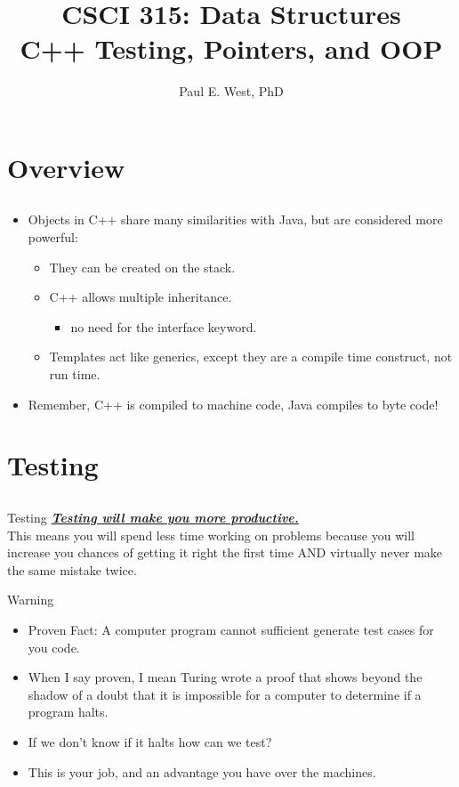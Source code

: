 \documentclass{beamer}
\title{CSCI 315: Data Structures \\ C++ Testing, Pointers, and OOP}
\author{Paul E. West, PhD}
\institute{
  Department of Computer Science\\
  Charleston Southern University
}
\begin{document}
\begin{frame}
  \titlepage
\end{frame}

\section{Overview}
\subsection{}

\begin{frame}{}
\begin{itemize}
\item Objects in C++ share many similarities with Java, but are considered more powerful:
\begin{itemize}
\item They can be created on the stack.
\item C++ allows multiple inheritance.
\begin{itemize}
\item no need for the interface keyword.
\end{itemize}
\item Templates act like generics, except they are a compile time construct, not run time.
\end{itemize}
\item Remember, C++ is compiled to machine code, Java compiles to byte code!
\end{itemize}
\end{frame}

\section{Testing}
\subsection{}

\begin{frame}{Testing}
\underline{\textbf{\textit{Testing will make you more productive.}}} \\
This means you will spend less time working on problems because you will increase you chances of getting it right the first time AND virtually never make the same mistake twice.
\end{frame}

\begin{frame}{Warning}
\begin{itemize}
\item Proven Fact: A computer program cannot sufficient generate test cases for you code.
\item When I say proven, I mean Turing wrote a proof that shows beyond the shadow of a doubt that it is impossible for a computer to determine if a program halts.
\item If we don't know if it halts how can we test?
\item This is your job, and an advantage you have over the machines.
\end{itemize}
\end{frame}
\end{document}
